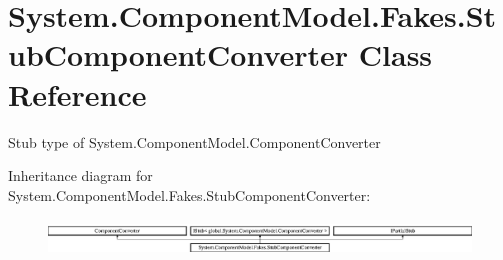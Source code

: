\hypertarget{class_system_1_1_component_model_1_1_fakes_1_1_stub_component_converter}{\section{System.\-Component\-Model.\-Fakes.\-Stub\-Component\-Converter Class Reference}
\label{class_system_1_1_component_model_1_1_fakes_1_1_stub_component_converter}
}


Stub type of System.\-Component\-Model.\-Component\-Converter 


Inheritance diagram for System.\-Component\-Model.\-Fakes.\-Stub\-Component\-Converter\-:\begin{figure}[H]
\begin{center}
\leavevmode
\includegraphics[height=0.992908cm]{class_system_1_1_component_model_1_1_fakes_1_1_stub_component_converter}
\end{center}
\end{figure}
